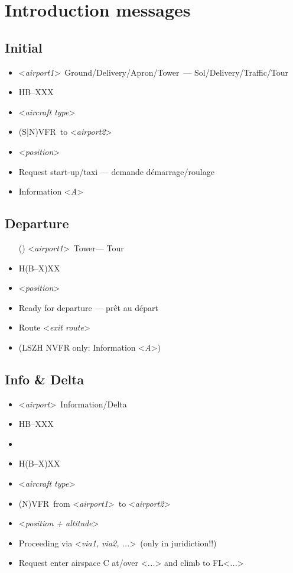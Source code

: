 \documentclass[12pt,twoside,a4paper]{article}
\title{\ThisTitle}
\author{\ThisAuthors\\{\small \mailto{gael.induni@gmail.com}} }
\date{Belfaux, \today\\[5mm]\normalsize Document version~\DocVersion}
\newcommand*{\Rep}[1]{<\emph{#1}>}
\newcommand*{\Act}[1]{{\color{red}{#1}} }
\newcommand*{\AP}[1][]{\Rep{airport#1}}
\newcommand*{\GND}{Ground}
\newcommand*{\DEL}{Delivery}
\newcommand*{\APR}{Apron}
\newcommand*{\TWR}{Tower}
\newcommand*{\INFO}{Information}
\newcommand*{\DELTA}{Delta}
\newcommand*{\SOL}{Sol}
\newcommand*{\TOR}{Tour}
\newcommand*{\HB}{HB--XXX}
\newcommand*{\ShortHB}{H(B--X)XX}
\newcommand*{\TYPE}{\Rep{aircraft type}}
\newcommand*{\VFR}{VFR}
\newcommand*{\NVFR}{(N)\VFR}
\newcommand*{\SNVFR}{(S|N)\VFR}
\newcommand*{\POS}{\Rep{position}}
\newcommand*{\POSDDD}{\Rep{position + altitude}}
\newcommand*{\InfoA}{\Rep{A}}
\newcommand*{\Via}{\Rep{via1, via2, ...}}
\newcommand*{\WAIT}{\Act{.....wait for answer.....}}
\numberwithin{equation}{section}
\numberwithin{figure}{section}
\begin{document}
\section{Introduction messages}%
\label{sec:introo}
\subsection{Initial}%
\label{sec:intro:init}
\begin{itemize}
	\item \AP[1]\ \GND/\DEL/\APR/\TWR\ --- \SOL/\DEL/Traffic/\TOR
	\item \HB
	\item \TYPE
	\item \SNVFR\ to \AP[2]
	\item \POS
	\item Request start-up/taxi --- demande d\'emarrage/roulage
	\item Information \InfoA
\end{itemize}
\subsection{Departure}%
\label{sec:intro:departure}
\begin{itemize}
	\item[(\textbullet)] \AP[1]\ \TWR --- \TOR
	\item \ShortHB
	\item \POS
	\item Ready for departure --- pr\^et au d\'epart
	\item Route \Rep{exit route}
	\item (LSZH NVFR only: Information \InfoA)
\end{itemize}
\subsection{Info \& Delta}%
\label{sec:intro:InfoDelta}
\begin{itemize}
\renewcommand{\labelitemi}{\bfseries I+D}
	\item \AP\ \INFO/\DELTA
	\item \HB
	\item \WAIT
	\item \ShortHB
	\item \TYPE
	\item \NVFR\ from \AP[1]\ to \AP[2]
	\item \POSDDD
	\item Proceeding via \Via\ (only in juridiction!!)
\renewcommand{\labelitemi}{\bfseries D}
	\item Request enter airspace C at/over \Rep{...} and climb to FL\Rep{...}
\end{itemize}
\end{document}
